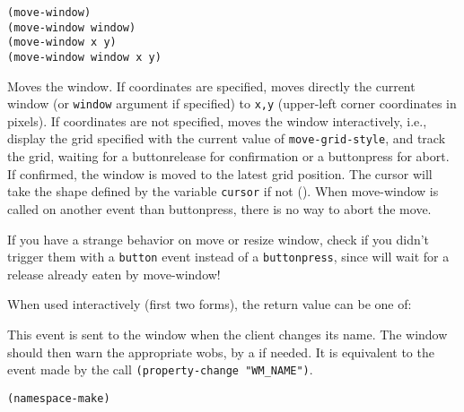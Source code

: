         
{\usagefont\begin{verbatim}
(move-window)
(move-window window)
(move-window x y)
(move-window window x y)
\end{verbatim}}\usageupspace

Moves the window. If coordinates are specified, moves directly the current
window (or \verb"window" argument if specified) to \verb"x,y" (upper-left
corner coordinates in pixels). If coordinates are not specified, moves the
window interactively, i.e., display the grid specified with the current
value of \verb"move-grid-style", and track the grid, waiting for a
buttonrelease for confirmation or a buttonpress for abort. If confirmed, the
window is moved to the latest grid position. The cursor will take the shape
defined by the variable \verb"cursor" if not ().  When move-window is called
on another event than buttonpress, there is no way to abort the move.

If you have a strange behavior on move or resize window, check if you
didn't trigger them with a \verb"button" event instead of a
\verb"buttonpress", since {\GWM} will wait for a release already eaten by
move-window!

When used interactively (first two forms), the return value can be one of:


        

This event is sent to the window when the client changes its name.  The
window should then warn the appropriate wobs, by a  if
needed. It is equivalent to the event made by the call 
\verb|(property-change "WM_NAME")|.


{\usagefont\begin{verbatim}
(namespace-make)
\end{verbatim}}\usageupspace

